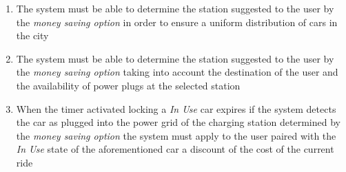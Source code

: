 \begin{description}
\begin{enumerate}[resume*]
  				\item The system must be able to determine the station suggested to the user by the
  				\emph{money saving option} in order to ensure a uniform distribution of cars in the
  				city
  				\item The system must be able to determine the station suggested to the user by the
  				\emph{money saving option} taking into account the destination of the user and
  				the availability of power plugs at the selected station
  				\item When the timer activated locking a \emph{In Use} car expires if the system
  				detects the car as plugged into the power grid of the charging station determined by
  				the \emph{money saving option} the system must apply to the user paired with the
  				\emph{In Use} state of the aforementioned car a discount of the cost of
  				the current ride		
   			\end{enumerate}
  	\end{description}

